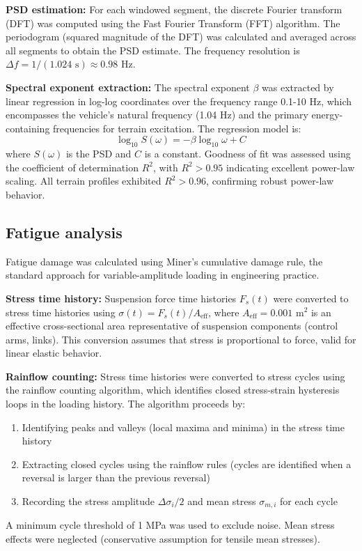\documentclass[11pt]{article}
\begin{document}
\textbf{PSD estimation:} For each windowed segment, the discrete Fourier transform (DFT) was computed using the Fast Fourier Transform (FFT) algorithm. The periodogram (squared magnitude of the DFT) was calculated and averaged across all segments to obtain the PSD estimate. The frequency resolution is $\Delta f = 1/(1.024 \text{ s}) \approx 0.98$ Hz.

\textbf{Spectral exponent extraction:} The spectral exponent $\beta$ was extracted by linear regression in log-log coordinates over the frequency range 0.1-10 Hz, which encompasses the vehicle's natural frequency (1.04 Hz) and the primary energy-containing frequencies for terrain excitation. The regression model is:
\begin{equation}
\log_{10} S(\omega) = -\beta \log_{10} \omega + C
\end{equation}
where $S(\omega)$ is the PSD and $C$ is a constant. Goodness of fit was assessed using the coefficient of determination $R^2$, with $R^2 > 0.95$ indicating excellent power-law scaling. All terrain profiles exhibited $R^2 > 0.96$, confirming robust power-law behavior.

\subsection*{Fatigue analysis}

Fatigue damage was calculated using Miner's cumulative damage rule\cite{Miner1945}, the standard approach for variable-amplitude loading in engineering practice.

\textbf{Stress time history:} Suspension force time histories $F_s(t)$ were converted to stress time histories using $\sigma(t) = F_s(t)/A_{\text{eff}}$, where $A_{\text{eff}} = 0.001$ m$^2$ is an effective cross-sectional area representative of suspension components (control arms, links). This conversion assumes that stress is proportional to force, valid for linear elastic behavior.

\textbf{Rainflow counting:} Stress time histories were converted to stress cycles using the rainflow counting algorithm\cite{ASTM_E1049}, which identifies closed stress-strain hysteresis loops in the loading history. The algorithm proceeds by:
\begin{enumerate}
\item Identifying peaks and valleys (local maxima and minima) in the stress time history
\item Extracting closed cycles using the rainflow rules (cycles are identified when a reversal is larger than the previous reversal)
\item Recording the stress amplitude $\Delta\sigma_i/2$ and mean stress $\sigma_{m,i}$ for each cycle
\end{enumerate}
A minimum cycle threshold of 1 MPa was used to exclude noise. Mean stress effects were neglected (conservative assumption for tensile mean stresses).
\end{document}
